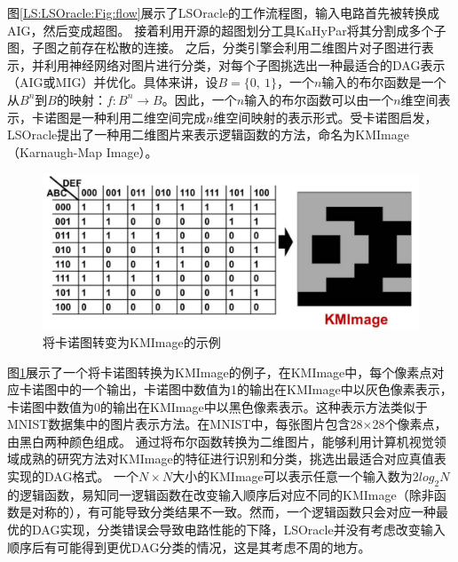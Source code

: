 图\ref{LS:LSOracle:Fig:flow}展示了LSOracle的工作流程图，输入电路首先被转换成AIG，然后变成超图。
接着利用开源的超图划分工具KaHyPar\cite{KaHyPar}将其分割成多个子图，子图之前存在松散的连接。
之后，分类引擎会利用二维图片对子图进行表示，并利用神经网络对图片进行分类，对每个子图挑选出一种最适合的DAG表示（AIG或MIG）并优化。具体来讲，设$B=\{0,\ 1\}$，一个$n$输入的布尔函数是一个从$B^n$到$B$的映射：$f: B^n \rightarrow B$。因此，一个$n$输入的布尔函数可以由一个$n$维空间表示，卡诺图是一种利用二维空间完成$n$维空间映射的表示形式。受卡诺图启发，LSOracle提出了一种用二维图片来表示逻辑函数的方法，命名为KMImage（Karnaugh-Map Image）。
\begin{figure}[!htbp]
    \centering
    \includegraphics[width=0.9\linewidth]{./figs/LS-LSOracle-KMImage.png}
    \caption{将卡诺图转变为KMImage的示例}
    \label{LS:LSOracle:Fig:KMImage}
\end{figure}
图\ref{LS:LSOracle:Fig:KMImage}展示了一个将卡诺图转换为KMImage的例子，在KMImage中，每个像素点对应卡诺图中的一个输出，卡诺图中数值为1的输出在KMImage中以灰色像素表示，卡诺图中数值为0的输出在KMImage中以黑色像素表示。这种表示方法类似于MNIST\cite{DNN:LeNet_MNIST}数据集中的图片表示方法。在MNIST中，每张图片包含28×28个像素点，由黑白两种颜色组成。
通过将布尔函数转换为二维图片，能够利用计算机视觉领域成熟的研究方法对KMImage的特征进行识别和分类，挑选出最适合对应真值表实现的DAG格式。
一个$N \times N$大小的KMImage可以表示任意一个输入数为$2log_2 N$的逻辑函数，易知同一逻辑函数在改变输入顺序后对应不同的KMImage（除非函数是对称的），有可能导致分类结果不一致。然而，一个逻辑函数只会对应一种最优的DAG实现，分类错误会导致电路性能的下降，LSOracle并没有考虑改变输入顺序后有可能得到更优DAG分类的情况，这是其考虑不周的地方。

